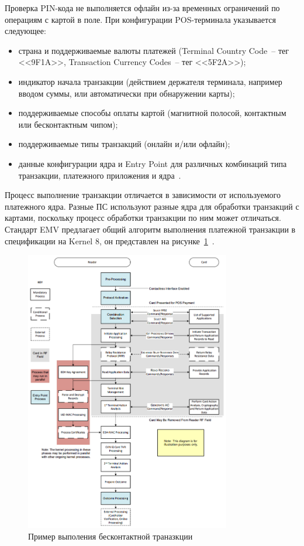 Проверка PIN-кода не выполняется офлайн из-за временных ограничений по операциям с картой в поле.
При конфигурации POS-терминала указывается следующее:

\begin{itemize}
    \item страна и поддерживаемые валюты платежей (Terminal Country Code~-- тег <<9F1A>>, Transaction Currency Codes~-- тег <<5F2A>>);
    \item индикатор начала транзакции (действием держателя терминала, например вводом суммы, или автоматически при обнаружении карты);
    \item поддерживаемые способы оплаты картой (магнитной полосой, контактным или бесконтактным чипом);
    \item поддерживаемые типы транзакций (онлайн и/или офлайн);
    \item данные конфигурации ядра и Entry Point для различных комбинаций типа транзакции, платежного приложения и ядра~\cite{emv_book_A}.
\end{itemize}

Процесс выполнение транзакции отличается в зависимости от используемого платежного ядра.
Разные ПС используют разные ядра для обработки транзакций с картами, поскольку процесс обработки транзакции по ним может отличаться.
Стандарт EMV предлагает общий алгоритм выполнения платежной транзакции в спецификации на Kernel 8, он представлен на рисунке~\ref{fig:kernel_transaction_flow}~\cite{emv_book_c8}.

\begin{figure}[H]
    \centering
    \includegraphics[width=0.8\textwidth]{images/research/kernel_transaction_flow}
    \caption{\centering Пример выполения бесконтактной траназкции}
    \label{fig:kernel_transaction_flow}
\end{figure}

